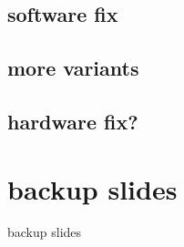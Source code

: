\subsection{software fix}

\subsection{more variants}

\subsection{hardware fix?}

\section{backup slides}
\begin{frame}{backup slides}
\end{frame}


